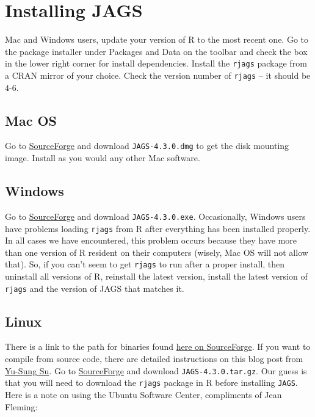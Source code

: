 \documentclass[12pt,english]{article}
\begin{document}
\section{Installing JAGS}

Mac and Windows users, update your version of R to the most recent one. Go to the package installer under \textsf{Packages and Data} on the toolbar and check the box in the lower right corner for \textsf{install dependencies}. Install the \texttt{rjags} package \citep{Plummer2016rjags} from a CRAN mirror of your choice. Check the version number of \texttt{rjags} -- it should be 4-6. 

\subsection{Mac OS}

Go to \href{https://sourceforge.net/projects/mcmc-jags/files/JAGS/4.x/Mac}{SourceForge} and download \texttt{JAGS-4.3.0.dmg} to get the disk mounting image. Install as you would any other Mac software.

\subsection{Windows}

Go to \href{https://sourceforge.net/projects/mcmc-jags/files/JAGS/4.x/Windows}{SourceForge} and download \texttt{JAGS-4.3.0.exe}. Occasionally, Windows users have problems loading \texttt{rjags} from R after everything has been installed properly. In all cases we have encountered, this problem occurs because they have more than one version of R resident on their computers (wisely, Mac OS will not allow that). So, if you can't seem to get \texttt{rjags} to run after a proper install, then uninstall all versions of R, reinstall the latest version, install the latest version of \texttt{rjags} and the version of JAGS that matches it. 

\subsection{Linux}

There is a link to the path for binaries found \href{http://mcmc-jags.sourceforge.net}{here on SourceForge}. If you want to compile from source code, there are detailed instructions on this blog post from \href{http://yusung.blogspot.com/2009/01/install-jags-and-rjags-in-fedora.html}{Yu-Sung Su}. Go to \href{https://sourceforge.net/projects/mcmc-jags/files/JAGS/4.x/Source/}{SourceForge} and download \texttt{JAGS-4.3.0.tar.gz}. Our guess is that you will need to download the \texttt{rjags} package in R before installing \texttt{JAGS}.  Here is a note on using the Ubuntu Software Center, compliments of Jean Fleming:
\end{document}
